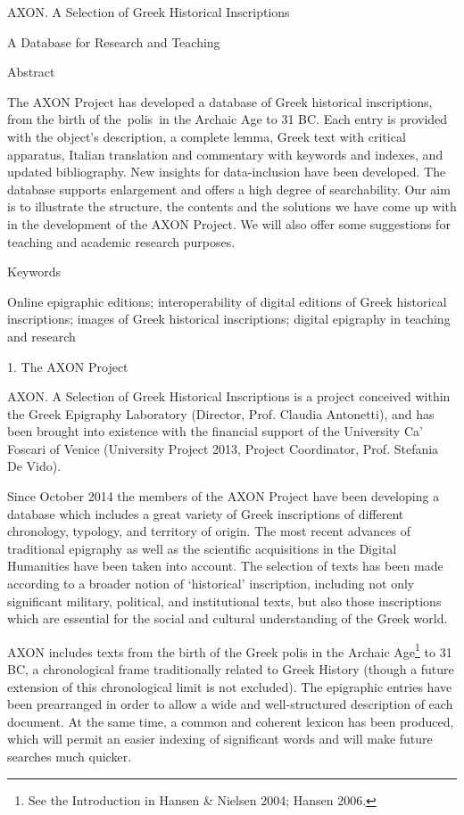 \documentclass[amsthm,ebook]{saparticle}
\title{}
\author{}
\date{}
\begin{document}
AXON. A Selection of Greek Historical Inscriptions

A Database for Research and Teaching


\bigskip

Abstract

The AXON Project has developed a database of Greek historical inscriptions, from the birth of the~polis~in the Archaic
Age to 31 BC. Each entry is provided with the object’s description, a complete lemma, Greek text with critical
apparatus, Italian translation and commentary with keywords and indexes, and updated bibliography. New insights for
data-inclusion have been developed. The database supports enlargement and offers a high degree of searchability. Our
aim is to illustrate the structure, the contents and the solutions we have come up with in the development of the AXON
Project. We will also offer some suggestions for teaching and academic research purposes.

Keywords

Online epigraphic editions; interoperability of digital editions of Greek historical inscriptions; images of Greek
historical inscriptions; digital epigraphy in teaching and research


\bigskip

1. The AXON Project 

AXON. A Selection of Greek Historical Inscriptions is a project conceived within the Greek Epigraphy Laboratory
(Director, Prof. Claudia Antonetti), and has been brought into existence with the financial support of the University
Ca’ Foscari of Venice (University Project 2013, Project Coordinator, Prof. Stefania De Vido).

Since October 2014 the members of the AXON Project have been developing a database which includes a great variety of
Greek inscriptions of different chronology, typology, and territory of origin. The most recent advances of traditional
epigraphy as well as the scientific acquisitions in the Digital Humanities have been taken into account. The selection
of texts has been made according to a broader notion of ‘historical’ inscription, including not only significant
military, political, and institutional texts, but also those inscriptions which are essential for the social and
cultural understanding of the Greek world. 

AXON includes texts from the birth of the Greek polis in the Archaic Age\footnote{ See the Introduction in Hansen \&
Nielsen 2004; Hansen 2006. } to 31 BC, a chronological frame traditionally related to Greek History (though a future
extension of this chronological limit is not excluded). The epigraphic entries have been prearranged in order to allow
a wide and well-structured description of each document. At the same time, a common and coherent lexicon has been
produced, which will permit an easier indexing of significant words and will make future searches much quicker. 
\end{document}
